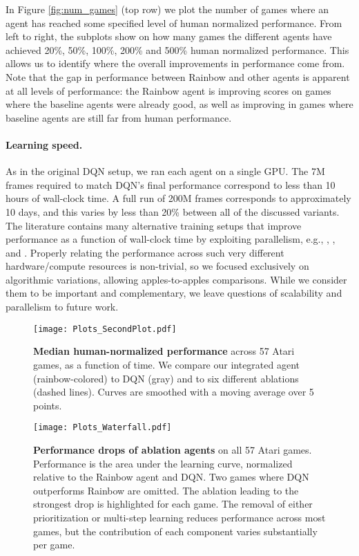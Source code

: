 \documentclass[letterpaper]{article} \usepackage{aaai18}  \usepackage{times}  \usepackage{helvet}  \usepackage{courier}  \usepackage{url}  \usepackage{graphicx}  \usepackage{amsmath,amssymb}
\begin{document}
In Figure \ref{fig:num_games} (top row) we plot the number of games where an agent has reached some specified level of human normalized performance. From left to right, the subplots show on how many games the different agents have achieved 20\%, 50\%, 100\%, 200\% and 500\% human normalized performance. This allows us to identify where the overall improvements in performance come from. Note that the gap in performance between Rainbow and other agents is apparent at all levels of performance: the Rainbow agent is improving scores on games where the baseline agents were already good, as well as improving in games where baseline agents are still far from human performance.

\paragraph{Learning speed.}
As in the original DQN setup, we ran each agent on a single GPU. The 7M frames required to match DQN's final performance correspond to less than 10 hours of wall-clock time. A full run of 200M frames corresponds to approximately 10 days, and this varies by less than 20\% between all of the discussed variants. The literature contains many alternative training setups that improve performance as a function of wall-clock time by exploiting parallelism, e.g., \citeauthor{Nair2015} , \citeauthor{nes_atari} , and \citeauthor{Mnih:2016} . Properly relating the performance across such very different hardware/compute resources is non-trivial, so we focused exclusively on algorithmic variations, allowing apples-to-apples comparisons. While we consider them to be important and complementary, we leave questions of scalability and parallelism to future work.

\begin{figure}[t]
\centering
\vspace*{-.7cm}
\texttt{[image: Plots\_SecondPlot.pdf]}
\vspace*{-0.7cm}
\caption{\textbf{Median human-normalized performance} across 57 Atari games, as a function of time. We compare our integrated agent (rainbow-colored) to DQN (gray) and to  six different ablations (dashed lines). Curves are smoothed with a moving average over 5 points.}
\label{fig:ks_vs_ablations}
\end{figure}


\begin{figure*}[t]
\centering
\texttt{[image: Plots\_Waterfall.pdf]}
\caption{\textbf{Performance drops of ablation agents} on all 57 Atari games. Performance is the area under the learning curve, normalized relative to the Rainbow agent and DQN. Two games where DQN outperforms Rainbow are omitted. The ablation leading to the strongest drop is highlighted for each game.
The removal of either prioritization or multi-step learning reduces performance across most games, but the contribution of each component varies substantially per game.}
\label{fig:rainbow_waterfall}
\end{figure*}
\end{document}
